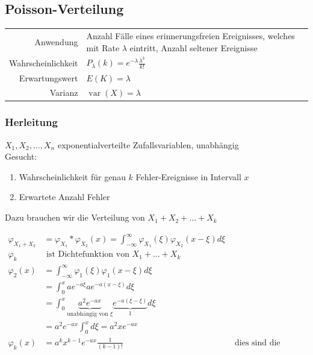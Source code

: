 \documentclass[10pt,a4paper]{scrartcl}
\newif\ifincludeDerivations
\DeclareMathOperator{\var}{var}
\begin{document}
\fi

\subsection{Poisson-Verteilung}
\begin{tabular}{r p{\katalogSpaltezwei}}
Anwendung & Anzahl Fälle eines erinnerungsfreien Ereignisses, welches mit Rate $\lambda$ eintritt, 
            Anzahl seltener Ereignisse \\
Wahrscheinlichkeit & $P_\lambda(k) = e^{-\lambda} \frac{\lambda^k}{k!}$ \\
Erwartungswert & $E(K) = \lambda $ \\
Varianz & $\var(X) = \lambda $
\end{tabular} 

\ifincludeDerivations
\subsubsection{Herleitung}
$X_1, X_2, \dots, X_n$ exponentialverteilte Zufallsvariablen, unabhängig \\
Gesucht: 
\begin{enumerate}
\item Wahrscheinlichkeit für genau $k$ Fehler-Ereignisse in Intervall $x$ \\ 
\item Erwartete Anzahl Fehler
\end{enumerate}

Dazu brauchen wir die Verteilung von $X_1 + X_2 + \dots + X_k$

\begin{align*}
\varphi_{X_1+X_2} & = \varphi_{X_1} * \varphi_{X_2} (x) = \int_{-\infty}^\infty \varphi_{X_1}(\xi) \varphi_{X_2}(x-\xi) d\xi \\ 
\varphi_k & \text{ ist Dichtefunktion von }X_1 + \dots + X_k \\
\varphi_2(x) & = \int_{-\infty}^\infty \varphi_1(\xi) \varphi_1(x-\xi) d\xi \\
& = \int_0^x ae^{-a\xi} ae^{-a(x-\xi)} d\xi \\
& = \int_0^x \underbrace{a^2e^{-ax}}_{\text{unabhängig von }\xi}\underbrace{e^{-a(\xi-\xi)}}_{1}d\xi \\
& = a^2e^{-ax} \int_0^x d\xi = a^2xe^{-ax} \\
\varphi_k(x) & = a^kx^{k-1}e^{-ax} \frac{1}{(k-1)!} & \text{ dies sind die Erlang-Verteilungen} 
\end{align*}
\end{document}
